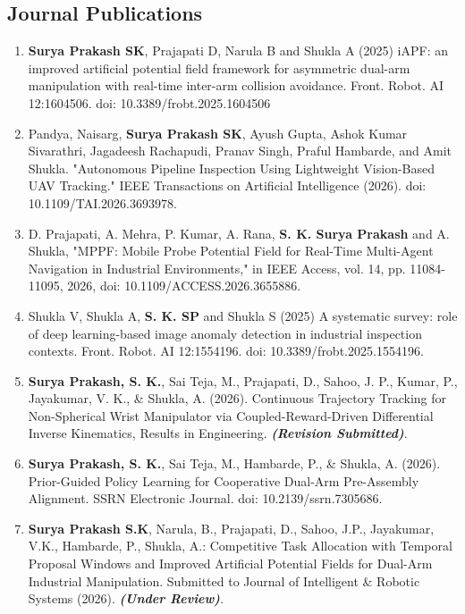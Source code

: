 \begin{Publications}

\pubpagenum

\section*{Journal Publications}
\begin{enumerate}
\item \textbf{Surya Prakash SK}, Prajapati D, Narula B and Shukla A (2025) iAPF: an improved artificial potential field framework for asymmetric dual-arm manipulation with real-time inter-arm collision avoidance. Front. Robot. AI 12:1604506. doi: 10.3389/frobt.2025.1604506
\item Pandya, Naisarg, \textbf{Surya Prakash SK}, Ayush Gupta, Ashok Kumar Sivarathri, Jagadeesh Rachapudi, Pranav Singh, Praful Hambarde, and Amit Shukla. "Autonomous Pipeline Inspection Using Lightweight Vision-Based UAV Tracking." IEEE Transactions on Artificial Intelligence (2026). doi: 10.1109/TAI.2026.3693978.
\item D. Prajapati, A. Mehra, P. Kumar, A. Rana, \textbf{S. K. Surya Prakash} and A. Shukla, "MPPF: Mobile Probe Potential Field for Real-Time Multi-Agent Navigation in Industrial Environments," in IEEE Access, vol. 14, pp. 11084-11095, 2026, doi: 10.1109/ACCESS.2026.3655886.

\item Shukla V, Shukla A, \textbf{S. K. SP} and Shukla S (2025) A systematic survey: role of deep learning-based image anomaly detection in industrial inspection contexts. Front. Robot. AI 12:1554196. doi: 10.3389/frobt.2025.1554196.

\item \textbf{Surya Prakash, S. K.}, Sai Teja, M., Prajapati, D., Sahoo, J. P., Kumar, P., Jayakumar, V. K., \& Shukla, A. (2026). Continuous Trajectory Tracking for Non-Spherical Wrist Manipulator via Coupled-Reward-Driven Differential Inverse Kinematics, Results in Engineering. \textbf{\textit{(Revision Submitted)}}.

\item \textbf{Surya Prakash, S. K.}, Sai Teja, M., Hambarde, P., \& Shukla, A. (2026). Prior-Guided Policy Learning for Cooperative Dual-Arm Pre-Assembly Alignment. SSRN Electronic Journal. doi: 10.2139/ssrn.7305686.

\item \textbf{Surya Prakash S.K}, Narula, B., Prajapati, D., Sahoo, J.P., Jayakumar, V.K., Hambarde, P., Shukla, A.: Competitive Task Allocation with Temporal Proposal Windows and Improved Artificial Potential Fields for Dual-Arm Industrial Manipulation. Submitted to Journal of Intelligent \& Robotic Systems (2026). \textbf{\textit{(Under Review)}}.


\end{enumerate}
\end{Publications}
